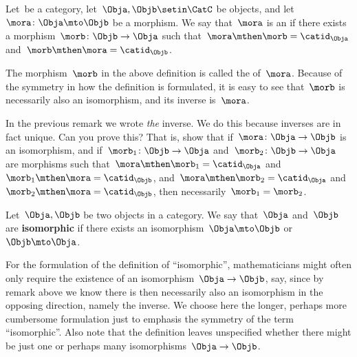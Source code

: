 \begin{ctdefinition}[Isomorphism]
    \label{def:isomorphism}
    Let~\CatC be a category, let~$\Obja,\Objb \setin \CatC$ be objects, and let~$\mora \colon \Obja \mto \Objb$ be a morphism.
    We say that~$\mora$ is an \emph{} if there exists a morphism~$\morb\colon \Objb \to \Obja$ such that~$\mora \mthen \morb = \catid_{\Obja}$ and~$\morb \mthen \mora = \catid_{\Objb}$.
\end{ctdefinition}

\begin{remark}
    \label{rem:inverse}
    The morphism~$\morb$ in the above definition is called the \textbf{} of~$\mora$.
    Because of the symmetry in how the definition is formulated, it is easy to see that~$\morb$ is necessarily also an isomorphism, and its inverse is~$\mora$.
\end{remark}

\begin{exercise}
    \label{ex:isoinverse}
    In the previous remark we wrote \emph{the} inverse.
    We do this because inverses are in fact unique.
    Can you prove this?
    That is, show that if~$\mora \colon \Obja \to \Objb$ is an isomorphism, and if~$\morb_1\colon \Objb \to \Obja$ and~$\morb_2\colon \Objb \to \Obja$ are morphisms such that~$\mora \mthen \morb_1 = \catid_\Obja$ and~$\morb_1 \mthen \mora = \catid_\Objb$, and~$\mora \mthen \morb_2 = \catid_\Obja$ and~$\morb_2 \mthen \mora = \catid_\Objb$, then necessarily~$\morb_1 = \morb_2$.
\end{exercise}
\begin{solution}
    \missingsolution
\end{solution}

\begin{ctdefinition}
    Let~$\Obja,\Objb$ be two objects in a category.
    We say that~$\Obja$ and~$\Objb$ are \textbf{isomorphic} if there exists an isomorphism~$\Obja \mto \Objb$ or~$\Objb \mto \Obja$.
\end{ctdefinition}

For the formulation of the definition of ``isomorphic'', mathematicians might often only require the existence of an isomorphism~$\Obja \to \Objb$, say, since by remark above we know there is then necessarily also an isomorphism in the opposing direction, namely the inverse.
We choose here the longer, perhaps more cumbersome formulation just to emphasis the symmetry of the term ``isomorphic''.
Also note that the definition leaves unspecified whether there might be just one or perhaps many isomorphisms~$\Obja \to \Objb$.

